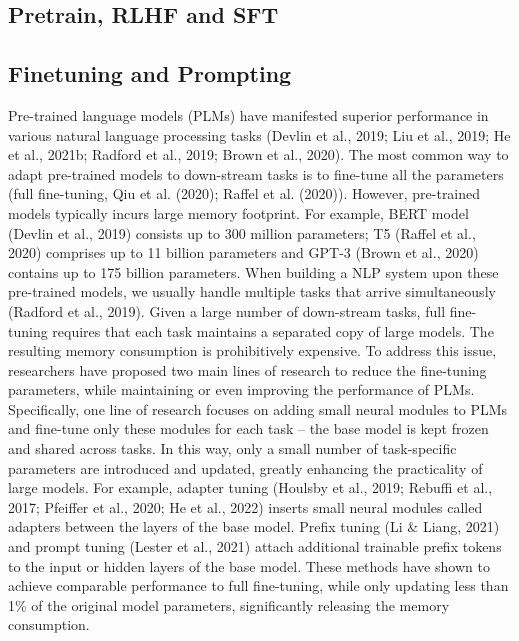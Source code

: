 \documentclass[withindex,glossary,firstyr]{cam-thesis}
\begin{document}
\subsection{Pretrain, RLHF and SFT}

\subsection{Finetuning and Prompting}
Pre-trained language models (PLMs) have manifested superior performance in various natural language processing tasks (Devlin et al., 2019; Liu et al., 2019; He et al., 2021b; Radford et al., 2019; Brown et al., 2020). The most common way to adapt pre-trained models to down-stream tasks is to fine-tune all the parameters (full fine-tuning, Qiu et al. (2020); Raffel et al. (2020)). However, pre-trained models typically incurs large memory footprint. For example, BERT model (Devlin et al., 2019) consists up to 300 million parameters; T5 (Raffel et al., 2020) comprises up to 11 billion parameters and GPT-3 (Brown et al., 2020) contains up to 175 billion parameters. When building a NLP system upon these pre-trained models, we usually handle multiple tasks that arrive simultaneously (Radford et al., 2019). Given a large number of down-stream tasks, full fine-tuning requires that each task maintains a separated copy of large models. The resulting memory consumption is prohibitively expensive.
To address this issue, researchers have proposed two main lines of research to reduce the fine-tuning parameters, while maintaining or even improving the performance of PLMs. Specifically, one line of research focuses on adding small neural modules to PLMs and fine-tune only these modules for each task – the base model is kept frozen and shared across tasks. In this way, only a small number of task-specific parameters are introduced and updated, greatly enhancing the practicality of large models. For example, adapter tuning (Houlsby et al., 2019; Rebuffi et al., 2017; Pfeiffer et al., 2020; He et al., 2022) inserts small neural modules called adapters between the layers of the base model. Prefix tuning (Li & Liang, 2021) and prompt tuning (Lester et al., 2021) attach additional trainable prefix tokens to the input or hidden layers of the base model. These methods have shown to achieve comparable performance to full fine-tuning, while only updating less than 1\% of the original model parameters, significantly releasing the memory consumption.
\end{document}
